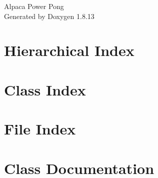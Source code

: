 \documentclass[twoside]{book}
\newcommand{\+}{\discretionary{\mbox{\scriptsize$\hookleftarrow$}}{}{}}
\newcommand{\clearemptydoublepage}{%
  \newpage{\pagestyle{empty}\cleardoublepage}%
}
\begin{document}
\hypersetup{pageanchor=false,
             bookmarksnumbered=true,
             pdfencoding=unicode
            }
\begin{titlepage}
\vspace*{7cm}
\begin{center}%
{\Large Alpaca Power Pong }\\
\vspace*{1cm}
{\large Generated by Doxygen 1.8.13}\\
\end{center}
\end{titlepage}
\clearemptydoublepage
{}
\tableofcontents
\clearemptydoublepage
{}
\hypersetup{pageanchor=true}

\chapter{Hierarchical Index}

\chapter{Class Index}

\chapter{File Index}

\chapter{Class Documentation}














\end{document}
